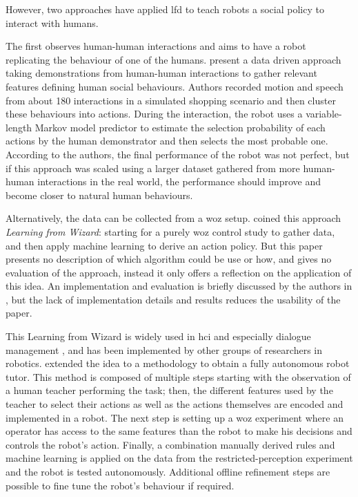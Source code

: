 	However, two approaches have applied \gls{lfd} to teach robots a social policy to interact with humans.
	
	The first observes human-human interactions and aims to have a robot replicating the behaviour of one of the humans. \citet{liu2014train} present a data driven approach taking demonstrations from human-human interactions to gather relevant features defining human social behaviours. Authors recorded motion and speech from about 180 interactions in a simulated shopping scenario and then cluster these behaviours into actions. During the interaction, the robot uses a variable-length Markov model predictor to estimate the selection probability of each actions by the human demonstrator and then selects the most probable one. According to the authors, the final performance of the robot was not perfect, but if this approach was scaled using a larger dataset gathered from more human-human interactions in the real world, the performance should improve and become closer to natural human behaviours.
    
    Alternatively, the data can be collected from a \gls{woz} setup. \cite{knox2014learning} coined this approach \emph{Learning from Wizard}: starting for a purely \gls{woz} control study to gather data, and then apply machine learning to derive an action policy. But this paper presents no description of which algorithm could be use or how, and gives no evaluation of the approach, instead it only offers a reflection on the application of this idea. An implementation and evaluation is briefly discussed by the authors in \cite{knox2016learning}, but the lack of implementation details and results reduces the usability of the paper.
    
    This Learning from Wizard is widely used in \gls{hci} and especially dialogue management \citep{rieser2008learning}, and has been implemented by other groups of researchers in robotics. \citet{sequeira2016discovering} extended the idea to a methodology to obtain a fully autonomous robot tutor. This method is composed of multiple steps starting with the observation of a human teacher performing the task; then, the different features used by the teacher to select their actions as well as the actions themselves are encoded and implemented in a robot. The next step is setting up a \gls{woz} experiment where an operator has access to the same features than the robot to make his decisions and controls the robot's action. Finally, a combination manually derived rules and machine learning is applied on the data from the restricted-perception experiment and the robot is tested autonomously. Additional offline refinement steps are possible to fine tune the robot's behaviour if required. 
    
